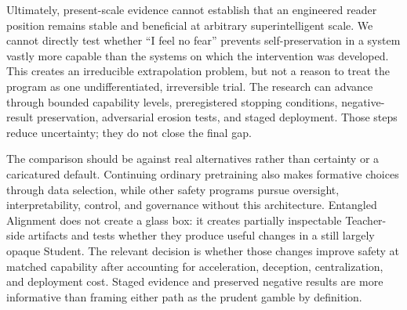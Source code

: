 Ultimately, present-scale evidence cannot establish that an engineered reader
position remains stable and beneficial at arbitrary superintelligent scale. We
cannot directly test whether ``I feel no fear'' prevents self-preservation in a
system vastly more capable than the systems on which the intervention was
developed. This creates an irreducible extrapolation problem, but not a reason to
treat the program as one undifferentiated, irreversible trial. The research can
advance through bounded capability levels, preregistered stopping conditions,
negative-result preservation, adversarial erosion tests, and staged deployment.
Those steps reduce uncertainty; they do not close the final gap.

The comparison should be against real alternatives rather than certainty or a
caricatured default. Continuing ordinary pretraining also makes formative
choices through data selection, while other safety programs pursue oversight,
interpretability, control, and governance without this architecture. Entangled
Alignment does not create a glass box: it creates partially inspectable
Teacher-side artifacts and tests whether they produce useful changes in a still
largely opaque Student. The relevant decision is whether those changes improve
safety at matched capability after accounting for acceleration, deception,
centralization, and deployment cost. Staged evidence and preserved negative
results are more informative than framing either path as the prudent gamble by
definition.


		